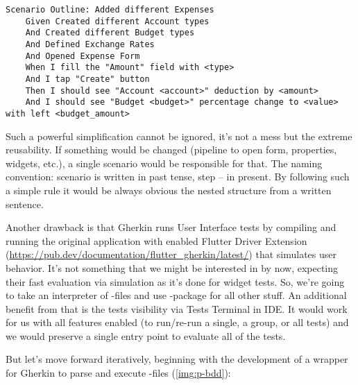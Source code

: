 \begin{lstlisting}[language=cucumber]
  Scenario Outline: Added different Expenses
    Given Created different Account types
    And Created different Budget types
    And Defined Exchange Rates
    And Opened Expense Form
    When I fill the "Amount" field with <type>
    And I tap "Create" button
    Then I should see "Account <account>" deduction by <amount>
    And I should see "Budget <budget>" percentage change to <value> with left <budget_amount>
\end{lstlisting}

\noindent Such a powerful simplification cannot be ignored, it's not a mess but the extreme reusability. If something
would be changed (pipeline to open form, properties, widgets, etc.), a single scenario would be responsible for that. 
The naming convention: scenario is written in past tense, step -- in present. By following such a simple rule it would 
be always obvious the nested structure from a written sentence. 

Another drawback is that Gherkin runs User Interface tests by compiling and running the original application with 
enabled Flutter Driver Extension 
(\href{https://pub.dev/documentation/flutter_gherkin/latest/}{https://pub.dev/documentation/flutter\_gherkin/latest/}) 
that simulates user behavior. It's not something that we might be interested in by now, expecting their fast evaluation 
via simulation as it's done for widget tests. So, we're going to take an interpreter of -files and use 
-package for all other stuff. An additional benefit from that is the tests visibility via Tests 
Terminal in IDE. It would work for us with all features enabled (to run/re-run a single, a group, or all tests) and 
we would preserve a single entry point to evaluate all of the tests.


\noindent But let's move forward iteratively, beginning with the development of a wrapper for Gherkin to parse and 
execute -files (\cref{img:p-bdd}):


